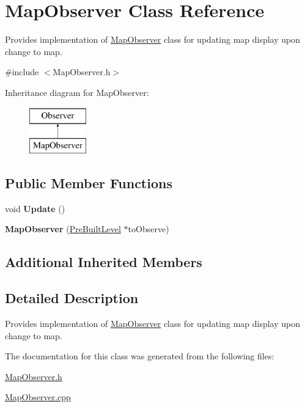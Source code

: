 \hypertarget{class_map_observer}{}\section{Map\+Observer Class Reference}
\label{class_map_observer}


Provides implementation of \hyperlink{class_map_observer}{Map\+Observer} class for updating map display upon change to map.  




{\ttfamily \#include $<$Map\+Observer.\+h$>$}

Inheritance diagram for Map\+Observer\+:\begin{figure}[H]
\begin{center}
\leavevmode
\includegraphics[height=2.000000cm]{class_map_observer}
\end{center}
\end{figure}
\subsection*{Public Member Functions}
\begin{DoxyCompactItemize}
\item 
\hypertarget{class_map_observer_aeea0273b48610e4e76b280946aab7723}{}\label{class_map_observer_aeea0273b48610e4e76b280946aab7723} 
void {\bfseries Update} ()
\item 
\hypertarget{class_map_observer_a9c75d62198d7fd0b63137f9f18dd3975}{}\label{class_map_observer_a9c75d62198d7fd0b63137f9f18dd3975} 
{\bfseries Map\+Observer} (\hyperlink{class_pre_built_level}{Pre\+Built\+Level} $\ast$to\+Observe)
\end{DoxyCompactItemize}
\subsection*{Additional Inherited Members}


\subsection{Detailed Description}
Provides implementation of \hyperlink{class_map_observer}{Map\+Observer} class for updating map display upon change to map. 

The documentation for this class was generated from the following files\+:\begin{DoxyCompactItemize}
\item 
\hyperlink{_map_observer_8h}{Map\+Observer.\+h}\item 
\hyperlink{_map_observer_8cpp}{Map\+Observer.\+cpp}\end{DoxyCompactItemize}
